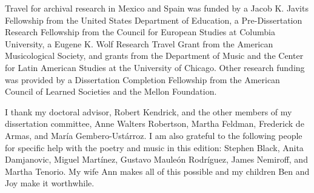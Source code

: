 Travel for archival research in Mexico and Spain was funded by 
a Jacob K. Javits Fellowship from the United States Department of Education, 
a Pre-Dissertation Research Fellowship from the Council for European Studies at 
Columbia University, 
a Eugene K. Wolf Research Travel Grant from the American Musicological Society, 
and grants from the Department of Music and the Center for Latin American 
Studies at the University of Chicago.
Other research funding was provided by a Dissertation Completion Fellowship 
from the American Council of Learned Societies and the Mellon Foundation.

I thank my doctoral advisor, Robert Kendrick, and the other members of my 
dissertation committee, Anne Walters Robertson, Martha Feldman, Frederick de 
Armas, and María Gembero-Ustárroz.
I am also grateful to the following people for specific help with the poetry 
and music in this edition:
Stephen Black,
Anita Damjanovic, 
Miguel Martínez, 
Gustavo Mauleón Rodríguez,
James Nemiroff, and
Martha Tenorio.
My wife Ann makes all of this possible and my children Ben and Joy make it
worthwhile.
